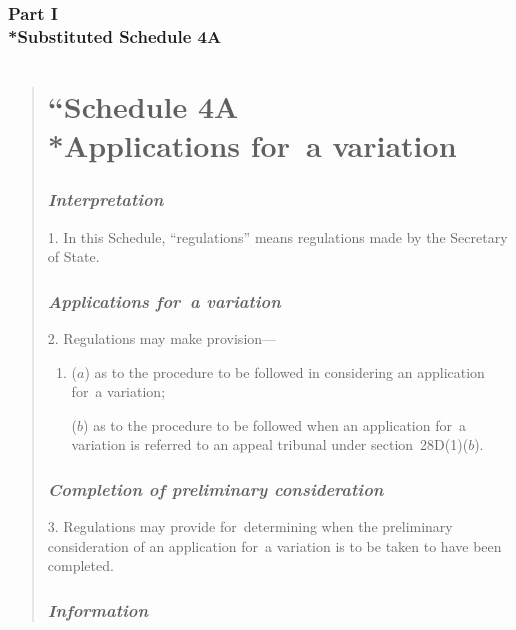 \documentclass[12pt,a4paper]{article}
\begin{document}
\renewcommand\parthead{--- Schedule 2 Part I}


\section[Part I --- Substituted Schedule 4A]{Part I\\*Substituted Schedule 4A}

\begin{quotation}
\part*{\noindent “S\lowercase{CHEDULE} 4A\\*Applications for~a variation}

\section*{\itshape Interpretation}

1. In this Schedule, “regulations” means regulations made by the Secretary of State.

\section*{\itshape Applications for~a variation}

2. Regulations may make provision—
\begin{enumerate}\item[]
($a$) as to the procedure to be followed in considering an application for~a variation;

($b$) as to the procedure to be followed when an application for~a variation is referred to an appeal tribunal under section~28D(1)($b$).
\end{enumerate}

\section*{\itshape Completion of preliminary consideration}

3. Regulations may provide for~determining when the preliminary consideration of an application for~a variation is to be taken to have been completed.

\section*{\itshape Information}


\end{quotation}
\end{document}

